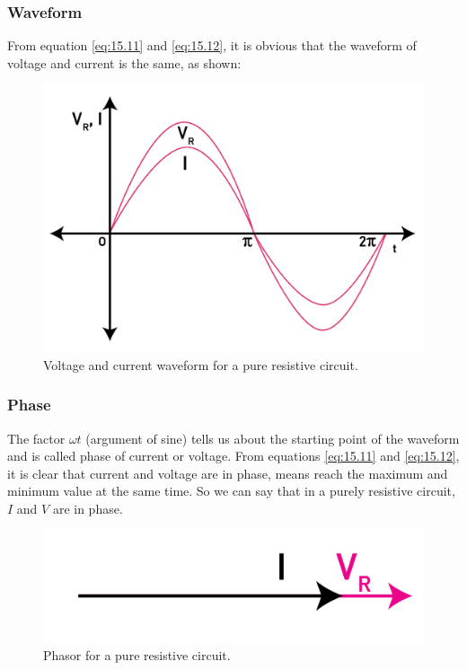 \subsubsection{Waveform}
From equation \ref{eq:15.11} and \ref{eq:15.12}, it is obvious
that the waveform of voltage and
current is the same, as shown:
\begin{figure}[H]
    \centering
    \includegraphics[scale = 0.8]{Images/Chapter-15/15.8}
    \caption{Voltage and current waveform for a pure resistive circuit.}
    \label{fig:15.8}
\end{figure}
\subsubsection{Phase}
The factor $\omega t$ (argument of sine) tells us about the starting point
of the waveform and is called phase of current or voltage.
From equations \ref{eq:15.11} and \ref{eq:15.12}, it is clear that
current and voltage are in phase, means reach the maximum 
and minimum value at the same time. So we can say that in a
purely resistive circuit, $I$ and $V$ are in phase.
\begin{figure}[H]
    \centering
    \includegraphics[]{Images/Chapter-15/15.9}
    \caption{Phasor for a pure resistive circuit.}
    \label{fig:15.9}
\end{figure}
